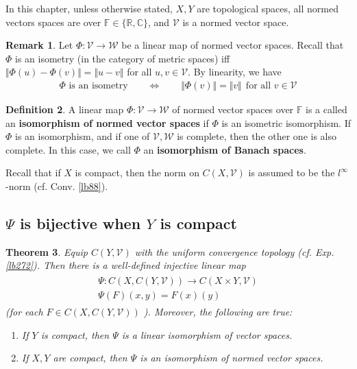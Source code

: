 \documentclass[12pt,b5paper,notitlepage]{article}
\theoremstyle{definition}
\newtheorem{df}{Definition}[section]
\newtheorem{rem}[df]{Remark}
\theoremstyle{plain}
\newtheorem{thm}[df]{Theorem}
\newcommand{\mc}{\mathcal}
\newcommand{\Cbb}{\mathbb C}
\newcommand{\Rbb}{\mathbb R}
\newcommand{\Fbb}{\mathbb F}
\numberwithin{equation}{section}
\begin{document}
In this chapter, unless otherwise stated,  $X,Y$ are topological spaces, all normed vectors spaces are over $\Fbb\in\{\Rbb,\Cbb\}$, and $\mc V$ is a normed vector space.

\begin{rem}
Let $\Phi:\mc V\rightarrow\mc W$ be a linear map of normed vector spaces. Recall that $\Phi$ is an isometry (in the category of metric spaces) iff $\Vert \Phi(u)-\Phi(v)\Vert=\Vert u-v\Vert$ for all $u,v\in\mc V$. By linearity, we have
\begin{align}
\Phi\text{ is an isometry}\qquad \Longleftrightarrow\qquad \Vert\Phi(v)\Vert=\Vert v\Vert~~\text{for all } v\in\mc V
\end{align}
\end{rem}


\begin{df}\label{lb302}
A linear map $\Phi:\mc V\rightarrow\mc W$ of normed vector spaces over $\Fbb$ is a called an \textbf{isomorphism of normed vector spaces}  if $\Phi$ is an isometric isomorphism. If $\Phi$ is an isomorphism, and if one of $\mc V,\mc W$ is complete, then the other one is also complete. In this case, we call $\Phi$ an \textbf{isomorphism of Banach spaces}.
\end{df}


Recall that if $X$ is compact, then the norm on $C(X,\mc V)$ is assumed to be the $l^\infty$-norm (cf. Conv. \ref{lb88}).


\subsection{$\Psi$ is bijective when $Y$ is compact}



\begin{thm}\label{lb274}
Equip $C(Y,\mc V)$ with the uniform convergence topology (cf. Exp. \ref{lb272}). Then there is a well-defined injective linear map
\begin{gather}\label{eq77}
\begin{gathered}
\Psi:C(X,C(Y,\mc V))\rightarrow C(X\times Y,\mc V)\\[0.5ex]
\Psi(F)(x,y)=F(x)(y)
\end{gathered}
\end{gather}
(for each $F\in C(X,C(Y,\mc V))$ ). Moreover, the following are true:
\begin{enumerate}[label=(\alph*)]
\item If $Y$ is compact, then $\Psi$ is a linear isomorphism of vector spaces.
\item If $X,Y$ are compact, then $\Psi$ is an isomorphism of normed vector spaces.
\end{enumerate}
\end{thm}
\end{document}

